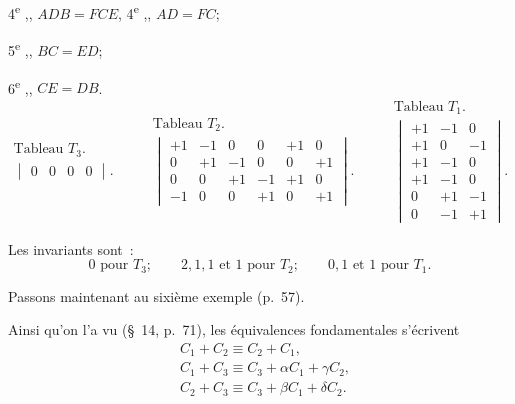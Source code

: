 \documentclass{article}
\begin{document}
4\textsuperscript{e} ,, $ADB = FCE$, 4\textsuperscript{e} ,, $AD = FC$;

5\textsuperscript{e} ,, $BC = ED$;

6\textsuperscript{e} ,, $CE = DB$.
\[ \begin{gathered} \text{Tableau } T_{3}. \\ \begin{vmatrix} 0 & 0 & 0 & 0 \end{vmatrix}. \end{gathered} \qquad \begin{gathered} \text{Tableau } T_{2}. \\ \begin{vmatrix} +1 & -1 & 0 & 0 & +1 & 0 \\[1ex] 0 & +1 & -1 & 0 & 0 & +1 \\[1ex] 0 & 0 & +1 & -1 & +1 & 0 \\[1ex] -1 & 0 & 0 & +1 & 0 & +1 \end{vmatrix}. \end{gathered} \qquad \begin{gathered} \text{Tableau } T_{1}. \\ \begin{vmatrix} +1 & -1 & 0 \\[1ex] +1 & 0 & -1 \\[1ex] +1 & -1 & 0 \\[1ex] +1 & -1 & 0 \\[1ex] 0 & +1 & -1 \\[1ex] 0 & -1 & +1 \end{vmatrix}. \end{gathered} \]

Les invariants sont~:
\[ 0 \text{ pour } T_{3}; \qquad 2, 1, 1 \text{ et } 1 \text{ pour } T_{2}; \qquad 0, 1 \text{ et } 1 \text{ pour } T_{1}. \]

Passons maintenant au sixième exemple (p.\ 57).

Ainsi qu'on l'a vu (\S~14, p.\ 71), les équivalences fondamentales s'écrivent
\[ \begin{aligned} &C_{1} + C_{2} \equiv C_{2} + C_{1},\\ &C_{1} + C_{3} \equiv C_{3} + \alpha C_{1} + \gamma C_{2},\\ &C_{2} + C_{3} \equiv C_{3} + \beta C_{1} + \delta C_{2}. \end{aligned} \]
\end{document}
